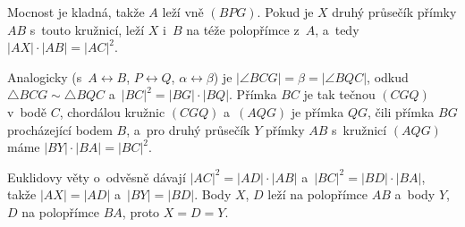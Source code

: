 {    Mocnost je kladná, takže $A$ leží vně $(BPG)$. Pokud je $X$ druhý průsečík přímky $AB$ s~touto kružnicí, leží $X$ i~$B$ na téže polopřímce z~$A$, a~tedy $|AX| \cdot |AB| = |AC|^2$.

    Analogicky (s~$A \leftrightarrow B$, $P \leftrightarrow Q$, $\alpha \leftrightarrow \beta$) je $|\angle BCG| = \beta = |\angle BQC|$, odkud $\triangle BCG \sim \triangle BQC$ a~$|BC|^2 = |BG| \cdot |BQ|$. Přímka $BC$ je tak tečnou $(CGQ)$ v~bodě $C$, chordálou kružnic $(CGQ)$ a~$(AQG)$ je přímka $QG$, čili přímka $BG$ procházející bodem $B$, a~pro druhý průsečík $Y$ přímky $AB$ s~kružnicí $(AQG)$ máme $|BY| \cdot |BA| = |BC|^2$.

    Euklidovy věty o~odvěsně dávají $|AC|^2 = |AD| \cdot |AB|$ a~$|BC|^2 = |BD| \cdot |BA|$, takže $|AX| = |AD|$ a~$|BY| = |BD|$. Body $X$, $D$ leží na polopřímce $AB$ a~body $Y$, $D$ na polopřímce $BA$, proto $X = D = Y$.
}

